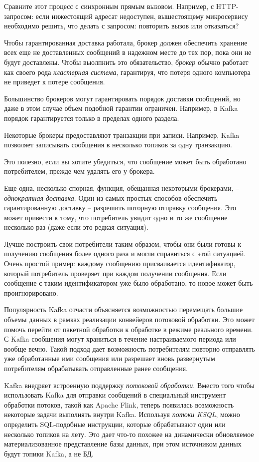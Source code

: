 \documentclass[%
	11pt,
	a4paper,
	utf8,
		]{article}
\begin{document}
Сравните этот процесс с синхронным прямым вызовом. Например, с HTTP-запросом: если нижестоящий адресат недоступен, вышестоящему микросервису необходимо решить, что делать с запросом: повторить вызов или отказаться?

Чтобы гарантированная доставка работала, брокер должен обеспечить хранение всех еще не доставленных сообщений в надежном месте до тех пор, пока они не будут доставлены. Чтобы выолпнить это обязательство, {\color{blue}\emph{брокер} обычно работает как своего рода \emph{кластерная система}, гарантируя, что потеря одного компьютера не приведет к потере сообщения.}

Большинство брокеров могут гарантировать порядок доставки сообщений, но даже в этом случае объем подобной гарантии ограничен. Например, в Kafka порядок гарантируется только в пределах одного раздела. 

Некоторые брокеры предоставляют транзакции при записи. Например, Kafka позволяет записывать сообщения в несколько топиков за одну транзакцию.

Это полезно, если вы хотите убедиться, что сообщение может быть обработано потребителем, прежде чем удалять его у брокера.

Еще одна, несколько спорная, функция, обещанная некоторыми брокерами, -- \emph{однократная доставка}. Один из самых простых способов обеспечить гарантированную доставку -- разрешить поторную отправку сообщения. Это может привести к тому, что потребитель увидит одно и то же сообщение несколько раз (даже если это редкая ситуация). 

Лучше построить свои потребители таким образом, чтобы они были готовы к получению сообщения более одного раза и могли справиться с этой ситуацией. Очень простой пример: каждому сообщению присваивается идентификатор, который потребитель проверяет при каждом получении сообщения. Если сообщение с таким идентификатором уже было обработано, то новое может быть проигнорировано.

Популярность Kafka отчасти объясняется возможностью перемещать большие объемы данных в рамках реализации конвейеров потоковой обработки. Это может помочь перейти от пакетной обработки к обработке в режиме реального времени. С Kafka сообщения могут храниться в течение настраиваемого периода или вообще вечно. Такой подход дает возможность потребителям повторно отправлять уже обработанные ими сообщения или разрешает вновь развернутым потребителям обрабатывать отправленные ранее сообщения.

Kafka внедряет встроенную поддержку \emph{потоковой обработки}. Вместо того чтобы использовать Kafka для отправки сообщений в специальный инструмент обработки потоков, такой как Apache Flink, теперь появилась возможность некоторые задачи выполнять внутри Kafka. Используя \emph{потоки KSQL}, можно определить SQL-подобные инструкции, которые обрабатывают один или несколько топиков на лету. Это дает что-то похожее на динамически обновляемое материализованное представление базы данных, при этом источником данных будут топики Kafka, а не БД.
\end{document}
